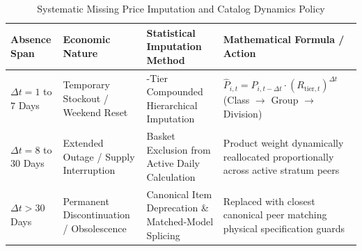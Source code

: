 \begin{table}[H]
\centering
\small
\setlength{\tabcolsep}{4pt}
\begin{tabularx}{\textwidth}{|>{\raggedright\arraybackslash}p{2.6cm}|>{\raggedright\arraybackslash}p{3.4cm}|>{\raggedright\arraybackslash}X|>{\raggedright\arraybackslash}X|}
\hline
\rowcolor{blue!20}
\textbf{Absence Span} & \textbf{Economic Nature} & \textbf{Statistical Imputation Method} & \textbf{Mathematical Formula / Action} \\ \hline
$\Delta t = 1$ to $7$ Days & Temporary Stockout / Weekend Reset & 3-Tier Compounded Hierarchical Imputation & $\widehat{P}_{i,t} = P_{i,t-\Delta t} \cdot (R_{\text{tier},t})^{\Delta t}$ (Class $\to$ Group $\to$ Division) \\ \hline
$\Delta t = 8$ to $30$ Days & Extended Outage / Supply Interruption & Basket Exclusion from Active Daily Calculation & Product weight dynamically reallocated proportionally across active stratum peers \\ \hline
$\Delta t > 30$ Days & Permanent Discontinuation / Obsolescence & Canonical Item Deprecation \& Matched-Model Splicing & Replaced with closest canonical peer matching physical specification guards \\ \hline
\end{tabularx}
\caption{Systematic Missing Price Imputation and Catalog Dynamics Policy}
\label{tab:missing_imputation_rules}
\end{table}

